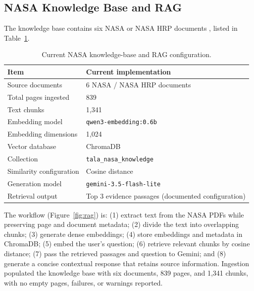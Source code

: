 \documentclass[11pt,a4paper]{article}
\begin{document}
\subsection{NASA Knowledge Base and RAG}

The knowledge base contains six NASA or NASA HRP documents \cite{nasa_std1,nasa_std2,ochmo_biomech,ochmo_exercise,hrp_fitness,hrp_sleep}, listed in Table~\ref{tab:kb}.

\begin{table}[H]
\centering
\caption{Current NASA knowledge-base and RAG configuration.}
\label{tab:kb}
\begin{tabularx}{\linewidth}{l X}
\toprule
\textbf{Item} & \textbf{Current implementation}\\
\midrule
Source documents & 6 NASA / NASA HRP documents\\
Total pages ingested & 839\\
Text chunks & 1,341\\
Embedding model & \texttt{qwen3-embedding:0.6b}\\
Embedding dimensions & 1,024\\
Vector database & ChromaDB\\
Collection & \texttt{tala\_\allowbreak nasa\_\allowbreak knowledge}\\
Similarity configuration & Cosine distance\\
Generation model & \texttt{gemini-3.5-flash-lite}\\
Retrieval output & Top 3 evidence passages (documented configuration)\\
\bottomrule
\end{tabularx}
\end{table}

The workflow (Figure~\ref{fig:rag}) is: (1) extract text from the NASA PDFs while preserving page and document metadata; (2) divide the text into overlapping chunks; (3) generate dense embeddings; (4) store embeddings and metadata in ChromaDB; (5) embed the user's question; (6) retrieve relevant chunks by cosine distance; (7) pass the retrieved passages and question to Gemini; and (8) generate a concise contextual response that retains source information. Ingestion populated the knowledge base with six documents, 839 pages, and 1,341 chunks, with no empty pages, failures, or warnings reported.
\end{document}

